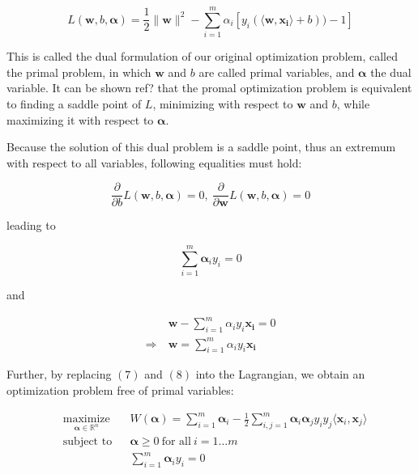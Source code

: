 \begin{equation}
  L(\mathbf{w}, b, \boldsymbol{\alpha}) = \frac{1}{2}\|\mathbf{w}\|^2 - \sum^m_{i=1} \alpha_i[y_i(\langle \mathbf{w}, \mathbf{x_i}\rangle + b)) - 1]
\end{equation}

This is called the dual formulation of our original optimization problem, called the primal problem, in which $\mathbf{w}$ and $b$ are called primal variables, and $\boldsymbol{\alpha}$ the dual variable. It can be shown \textcolor[rgb]{1,0,0}{ref?} that the promal optimization problem is equivalent to finding a saddle point of $L$, minimizing with respect to $\mathbf{w}$ and $b$, while maximizing it with respect to $
\boldsymbol{\alpha}$.

Because the solution of this dual problem is a saddle point, thus an extremum with respect to all variables, following equalities must hold:

\begin{equation}
  \frac{\partial}{\partial b}L(\mathbf{w}, b, \boldsymbol{\alpha}) = 0,\ 
  \frac{\partial}{\partial \mathbf{w}}L(\mathbf{w}, b, \boldsymbol{\alpha}) = 0
\end{equation}

leading to

\begin{equation}
\sum^m_{i=1} \boldsymbol{\alpha}_iy_i = 0  
\end{equation}

and 

\begin{equation}
  \begin{aligned}
    &\mathbf{w} - \sum^m_{i=1} \alpha_iy_i\mathbf{x_i} = 0 \\
    \Rightarrow\ &\mathbf{w} = \sum^m_{i=1} \alpha_iy_i\mathbf{x_i}
  \end{aligned}
\end{equation}

Further, by replacing $(7)$ and $(8)$ into the Lagrangian, we obtain an optimization problem free of primal variables:

\begin{equation}
  \begin{aligned}
    &\underset{\boldsymbol{\alpha} \in \mathbb{R}^n} {\text{maximize}}
    & & W(\boldsymbol{\alpha}) = \sum_{i=1}^m\boldsymbol{\alpha}_i - \frac{1}{2}\sum_{i,j=1}^m\boldsymbol{\alpha}_i\boldsymbol{\alpha}_jy_iy_j\langle\mathbf{x}_i, \mathbf{x}_j\rangle\\
    &\text{subject to}
    & &\boldsymbol{\alpha} \ge 0\ \text{for all}\ i = 1 \dotsc m\\
    & & &\sum^m_{i=1} \boldsymbol{\alpha}_iy_i = 0
  \end{aligned}
\end{equation}

